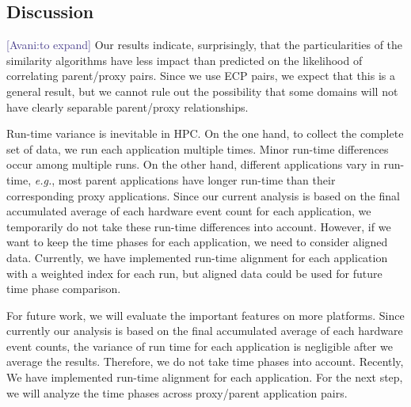 \documentclass[conference]{IEEEtran}
\newcommand{\eg}                {\emph{e.g.},\xspace}
\newcommand{\avani}[1]          {\textcolor{darkslateblue}{[Avani:#1]}}
\newcommand{\si}[1]           {\textcolor{darkgreen}{[Si:#1]}}
\begin{document}
\subsection{Discussion}
\avani{to expand}
Our results indicate, surprisingly, that the particularities of the similarity algorithms have less impact than predicted on the likelihood of correlating parent/proxy pairs.  Since we use ECP pairs, we expect that this is a general result, but we cannot rule out the possibility that some domains will not have clearly separable parent/proxy relationships.

Run-time variance is inevitable in HPC. On the one hand, to collect the complete set of data, we run each application multiple times. Minor run-time differences occur among multiple runs. On the other hand, different applications vary in run-time, \eg most parent applications have longer run-time than their corresponding proxy applications. Since our current analysis is based on the final accumulated average of each hardware event count for each application, we temporarily do not take these run-time differences into account. However, if we want to keep the time phases for each application, we need to consider aligned data. Currently, we have implemented run-time alignment for each application with a weighted index for each run, but aligned data could be used for future time phase comparison. 

For future work, we will evaluate the important features on more platforms. Since currently our analysis is based on the final accumulated average of each hardware event counts, the variance of run time for each application is negligible after we average the results. Therefore, we do not take time phases into account. Recently, We have implemented run-time alignment for each application. For the next step, we will analyze the time phases across proxy/parent application pairs.
\end{document}
